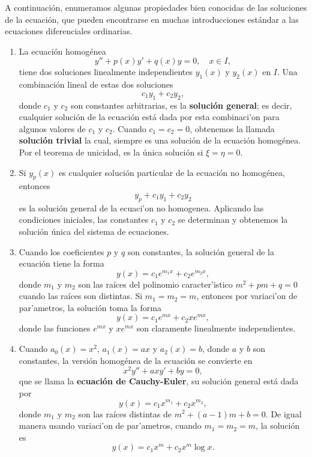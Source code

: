 \documentclass[main.tex]{subfiles}
\begin{document}
A continuación, enumeramos algunas propiedades bien conocidas de las soluciones de la ecuación, que pueden encontrarse en muchas introducciones estándar a las ecuaciones diferenciales ordinarias.

\begin{enumerate}
    \item La ecuación homogénea
    \[
    y''+p(x)y'+q(x)y=0,\quad x\in I,
    \]
    tiene dos soluciones linealmente independientes \(y_1(x)\) y \(y_2(x)\) en \(I\). Una combinación lineal de estas dos soluciones
    \[
    c_1y_1+c_2y_2,
    \]
    donde \(c_1\) y \(c_2\) son constantes arbitrarias, es la \textbf{solución general}; es decir, cualquier solución de la ecuación está dada por esta combinaci'on para algunos valores de \(c_1\) y \(c_2\). Cuando \(c_1=c_2=0\), obtenemos la llamada \textbf{solución trivial} la cual, siempre es una solución de la ecuación homogénea. Por el teorema de unicidad, es la única solución si \(\xi=\eta=0\).

    \item Si \(y_p(x)\) es cualquier solución particular de la ecuación no homogénea, entonces
    \[
    y_p+c_1y_1+c_2y_2
    \]
    es la solución general de la ecuaci'on no homogenea. Aplicando las condiciones iniciales, las constantes \(c_1\) y \(c_2\) se determinan y obtenemos la solución única del sistema de ecuaciones.

    \item Cuando los coeficientes \(p\) y \(q\) son constantes, la solución general de la ecuación tiene la forma
    \[
    y(x)=c_1 e^{m_1 x} + c_2 e^{m_2 x},
    \]
    donde \(m_1\) y \(m_2\) son las raíces del polinomio caracter'istico \(m^2+pm+q=0\) cuando las raíces son distintas. Si \(m_1=m_2=m\), entonces por variaci'on de par'ametros, la solución toma la forma
    \[
    y(x)=c_1 e^{m x}+c_2xe^{m x},
    \]
    donde las funciones \(e^{mx}\) y \(xe^{mx}\) son claramente linealmente independientes.

    \item Cuando \(a_0(x)=x^2\), \(a_1(x)=ax\) y \(a_2(x)=b\), donde \(a\) y \(b\) son constantes, la versión homogénea de la ecuación se convierte en
    \[
    x^2y''+axy'+by=0,
    \]
    que se llama la \textbf{ecuación de Cauchy-Euler}, su solución general está dada por
    \[
    y(x)=c_1 x^{m_1}+c_2 x^{m_2},
    \]
    donde \(m_1\) y \(m_2\) son las raíces distintas de \(m^2+(a-1)m+b=0\). De igual manera usando variaci'on de par'ametros, cuando \(m_1=m_2=m\), la solución es
    \[
    y(x)=c_1 x^m+c_2x^m\log x.
    \]


\end{enumerate}
\end{document}
